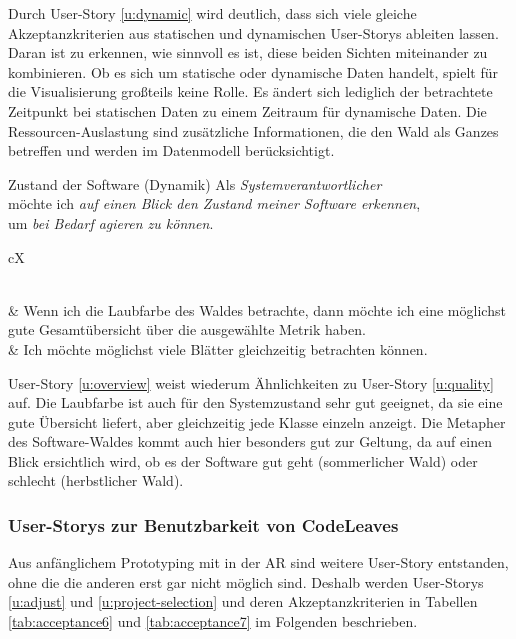 Durch User-Story \ref{u:dynamic} wird deutlich, dass sich viele gleiche Akzeptanzkriterien aus statischen und dynamischen User-Storys ableiten lassen. Daran ist zu erkennen, wie sinnvoll es ist, diese beiden Sichten miteinander zu kombinieren. Ob es sich um statische oder dynamische Daten handelt, spielt für die Visualisierung großteils keine Rolle. Es ändert sich lediglich der betrachtete Zeitpunkt bei statischen Daten zu einem Zeitraum für dynamische Daten. Die Ressourcen-Auslastung sind zusätzliche Informationen, die den Wald als Ganzes betreffen und werden im Datenmodell berücksichtigt.

\begin{userstory}[u:overview]{Zustand der Software (Dynamik)}
  Als \textit{Systemverantwortlicher}\\
  möchte ich \textit{auf einen Blick den Zustand meiner Software erkennen},\\
  um \textit{bei Bedarf agieren zu können}.
\end{userstory}

\setaccid
\begin{tabularx}{\textwidth}{cX}
	\caption{Akzeptanzkriterien zu User-Story \ref{u:overview}} \label{tab:acceptance5}\\
     & Wenn ich die Laubfarbe des Waldes betrachte, dann möchte ich eine möglichst gute Gesamtübersicht über die ausgewählte Metrik haben.\\
     & Ich möchte möglichst viele Blätter gleichzeitig betrachten können.\\
\end{tabularx}

User-Story \ref{u:overview} weist wiederum Ähnlichkeiten zu User-Story \ref{u:quality} auf. Die Laubfarbe ist auch für den Systemzustand sehr gut geeignet, da sie eine gute Übersicht liefert, aber gleichzeitig jede Klasse einzeln anzeigt. Die Metapher des Software-Waldes kommt auch hier besonders gut zur Geltung, da auf einen Blick ersichtlich wird, ob es der Software gut geht (sommerlicher Wald) oder schlecht (herbstlicher Wald).

\subsubsection*{User-Storys zur Benutzbarkeit von CodeLeaves}

Aus anfänglichem Prototyping mit in der AR sind weitere User-Story entstanden, ohne die die anderen erst gar nicht möglich sind. Deshalb werden User-Storys \ref{u:adjust} und \ref{u:project-selection} und deren Akzeptanzkriterien in Tabellen \ref{tab:acceptance6} und \ref{tab:acceptance7} im Folgenden beschrieben.

